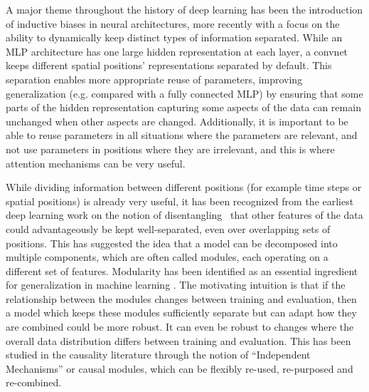 \documentclass{article}
\begin{document}
A major theme throughout the history of deep learning has been the introduction of inductive biases in neural architectures,
more recently with a focus on the ability to dynamically keep distinct types of information separated.  While an MLP architecture has one large hidden representation at each layer, a convnet keeps different spatial positions' representations separated by default.  This separation enables more appropriate reuse of parameters, improving generalization (e.g. compared with a fully connected MLP)
by ensuring that some parts of the hidden representation capturing some aspects of the data can remain unchanged when other aspects are changed.  Additionally, it is important to be able to reuse parameters in all situations where the parameters are relevant, and not use parameters in positions where they are irrelevant, and this is where attention
mechanisms can be very useful.

While dividing information between different positions (for example time steps or spatial positions) is already very useful, it has been recognized from
the earliest deep learning work on the notion of disentangling~\citep{bengio2009learning,glorot2011domain,rifai2012disentangling,mathieu2016disentangling,achille2018emergence} that other features of the data could advantageously be kept well-separated, even over overlapping sets of positions.  This has suggested the idea that a model can be decomposed into multiple components, which are often called modules, each operating on a different set of features.  Modularity has been identified as an essential ingredient for generalization in machine learning \citep{jacobs1991adaptive, bottou1991framework,ronco1996modular, reed2015neural, andreas2016neural,rosenbaum2017routing, fernando2017pathnet, shazeer2017outrageously,goyal2019recurrent, goyal2020object, rahaman2020s2rms, goyal2020inductive}.  The motivating intuition is that if the relationship between the modules changes between training and evaluation, then a model which keeps these modules sufficiently separate but can adapt how they are combined could be more robust. It can even be robust to changes where the overall data distribution differs between training and evaluation.  This has been studied in the causality literature through the notion of ``Independent Mechanisms'' \citep{peters2018deep} or causal modules, which can be flexibly re-used,  re-purposed and re-combined.
\end{document}
